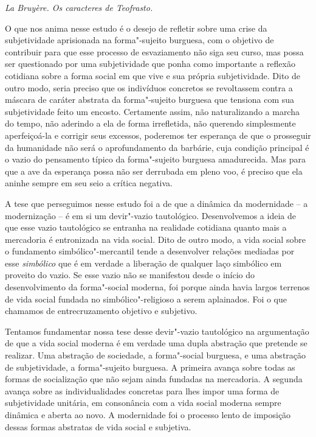 {\begin{flushright}
{\emph{La Bruyère. Os caracteres de Teofrasto.}}
\end{flushright}

O que nos anima nesse estudo é o desejo de refletir sobre uma crise da
subjetividade aprisionada na forma"-sujeito burguesa, com o objetivo de
contribuir para que esse processo de esvaziamento não siga seu curso,
mas possa ser questionado por uma subjetividade que ponha como
importante a reflexão cotidiana sobre a forma social em que vive e sua
própria subjetividade. Dito de outro modo, seria preciso que os
indivíduos concretos se revoltassem contra a máscara de caráter abstrata
da forma"-sujeito burguesa que tensiona com sua subjetividade feito um
encosto. Certamente assim, não naturalizando a marcha do tempo, não
aderindo a ela de forma irrefletida, não querendo simplesmente
aperfeiçoá-la e corrigir seus excessos, poderemos ter esperança de que o
prosseguir da humanidade não será o aprofundamento da barbárie, cuja
condição principal é o vazio do pensamento típico da forma"-sujeito
burguesa amadurecida. Mas para que a ave da esperança possa não ser
derrubada em pleno voo, é preciso que ela aninhe sempre em seu seio a
crítica negativa.

A tese que perseguimos nesse estudo foi a de que a dinâmica da
modernidade -- a modernização -- é em si um devir"-vazio tautológico.
Desenvolvemos a ideia de que esse vazio tautológico se entranha na
realidade cotidiana quanto mais a mercadoria é entronizada na vida
social. Dito de outro modo, a vida social sobre o fundamento
simbólico"-mercantil tende a desenvolver relações mediadas por esse
\emph{simbólico} que é em verdade a liberação de qualquer laço simbólico
em proveito do vazio. Se esse vazio não se manifestou desde o início do
desenvolvimento da forma"-social moderna, foi porque ainda havia largos
terrenos de vida social fundada no simbólico"-religioso a serem
aplainados. Foi o que chamamos de entrecruzamento objetivo e subjetivo.

Tentamos fundamentar nossa tese desse devir"-vazio tautológico na
argumentação de que a vida social moderna é em verdade uma dupla
abstração que pretende se realizar. Uma abstração de sociedade, a
forma"-social burguesa, e uma abstração de subjetividade, a forma"-sujeito
burguesa. A primeira avança sobre todas as formas de socialização que
não sejam ainda fundadas na mercadoria. A segunda avança sobre as
individualidades concretas para lhes impor uma forma de subjetividade
unitária, em consonância com a vida social moderna sempre dinâmica e
aberta ao novo. A modernidade foi o processo lento de imposição dessas
formas abstratas de vida social e subjetiva.

}
